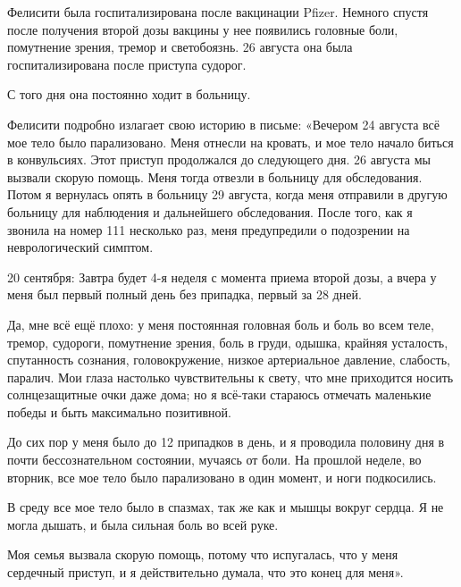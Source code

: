 Фелисити была госпитализирована после вакцинации Pfizer. Немного спустя после
получения второй дозы вакцины у нее появились головные боли, помутнение зрения,
тремор и светобоязнь. 26 августа она была госпитализирована после приступа
судорог.

С того дня она постоянно ходит в больницу.

Фелисити подробно излагает свою историю в письме: «Вечером 24 августа всё мое
тело было парализовано. Меня отнесли на кровать, и мое тело начало биться в
конвульсиях. Этот приступ продолжался до следующего дня. 26 августа мы вызвали
скорую помощь. Меня тогда отвезли в больницу для обследования. Потом я вернулась
опять в больницу 29 августа, когда меня отправили в другую больницу для
наблюдения и дальнейшего обследования. После того, как я звонила на номер 111
несколько раз, меня предупредили о подозрении на неврологический симптом.

20 сентября: Завтра будет 4-я неделя с момента приема второй дозы, а вчера у
меня был первый полный день без припадка, первый за 28 дней.

Да, мне всё ещё плохо: у меня постоянная головная боль и боль во всем теле,
тремор, судороги, помутнение зрения, боль в груди, одышка, крайняя усталость,
спутанность сознания, головокружение, низкое артериальное давление, слабость,
паралич. Мои глаза настолько чувствительны к свету, что мне приходится носить
солнцезащитные очки даже дома; но я всё-таки стараюсь отмечать маленькие победы
и быть максимально позитивной.

До сих пор у меня было до 12 припадков в день, и я проводила половину дня в
почти бессознательном состоянии, мучаясь от боли. На прошлой неделе, во вторник,
все мое тело было парализовано в один момент, и ноги подкосились.

В среду все мое тело было в спазмах, так же как и мышцы вокруг сердца. Я не
могла дышать, и была сильная боль во всей руке.

Моя семья вызвала скорую помощь, потому что испугалась, что у меня сердечный
приступ, и я действительно думала, что это конец для меня».
